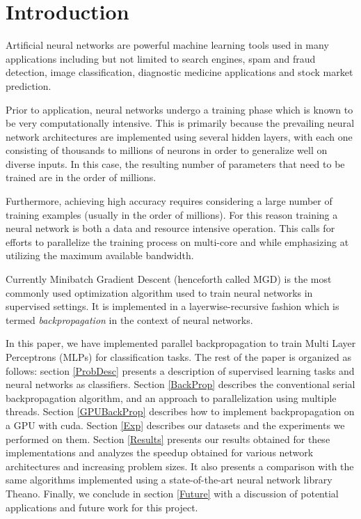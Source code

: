 \section{Introduction}
\label{Intro}

Artificial neural networks are powerful machine learning tools used in many applications including but not limited to search engines, spam and fraud detection, image classification, diagnostic medicine applications and stock market prediction.

Prior to application, neural networks undergo a training phase which is known to be very computationally intensive. This is primarily because the prevailing neural network architectures are implemented using several hidden layers, with each one consisting of thousands to millions of neurons in order to generalize well on diverse inputs. In this case, the resulting number of parameters that need to be trained are in the order of millions.

Furthermore, achieving high accuracy requires considering a large number of training examples (usually in the order of millions). For this reason training a neural network is both a data and resource intensive operation. This calls for efforts to parallelize the training process on multi-core and while emphasizing at utilizing the maximum available bandwidth.

Currently Minibatch Gradient Descent (henceforth called MGD) is the most commonly used optimization algorithm used to train neural networks in supervised settings. It is implemented in a layerwise-recursive fashion which is termed \textit{backpropagation} in the context of neural networks.

In this paper, we have implemented parallel backpropagation to train Multi Layer Perceptrons (MLPs) for classification tasks.
The rest of the paper is organized as follows: section \ref{ProbDesc} presents a description of supervised learning tasks and neural networks as classifiers. Section \ref{BackProp} describes the conventional serial backpropagation algorithm, and an approach to parallelization using multiple threads. Section \ref{GPUBackProp} describes how to implement backpropagation on a GPU with cuda. Section \ref{Exp} describes our datasets and the experiments we performed on them. Section \ref{Results} presents our results obtained for these implementations and analyzes the speedup obtained for various network architectures and increasing problem sizes. It also presents a comparison with the same algorithms implemented using a state-of-the-art neural network library Theano. Finally, we conclude in section \ref{Future} with a discussion of potential applications and future work for this project.